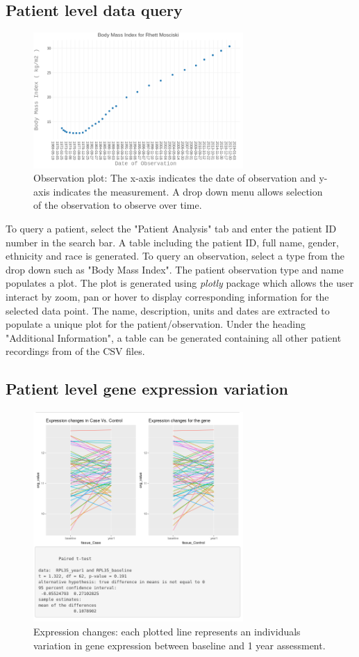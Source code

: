 \documentclass{bioinfo}
\begin{document}
\subsection{Patient level data query}
\begin{figure}[!h]
\includegraphics[width=8cm]{BMIpatient.png}
\caption{Observation plot: The x-axis indicates the date of observation and y-axis indicates the measurement. A drop down menu allows selection of the observation to observe over time.}
\end{figure}

To query a patient, select the "Patient Analysis" tab and enter the patient ID number in the search bar. A table including the patient ID, full name, gender, ethnicity and race is generated. 
To query an observation, select a type from the drop down such as "Body Mass Index". The patient observation type and name populates a plot. The plot is generated using \textit{plotly} package which allows the user interact by zoom, pan or hover to display corresponding information for the selected data point. The name, description, units and dates are extracted to populate a unique plot for the patient/observation. Under the heading "Additional Information", a table can be generated containing all other patient recordings from of the CSV files. 



\subsection{Patient level gene expression variation}

\begin{figure}[!h]
\includegraphics[width=8cm, height=8cm]{exprschangettest.png}
\caption{Expression changes: each plotted line represents an individuals variation in gene expression between baseline and 1 year assessment.}
\end{figure}
\end{document}
